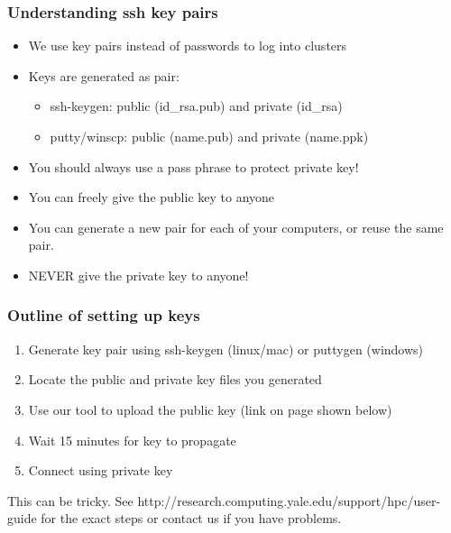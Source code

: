 \documentclass[10pt]{beamer}
\begin{document}
\begin{frame}[fragile]
\frametitle{Understanding ssh key pairs}
\begin{itemize}
\item We use key pairs instead of passwords to log into clusters
\item Keys are generated as pair:
\begin{itemize}
\item ssh-keygen: public (id\_rsa.pub) and private (id\_rsa)
\item putty/winscp: public (name.pub) and private (name.ppk)
\end{itemize}
\item You should always use a pass phrase to protect private key!
\item You can freely give the public key to anyone
\item You can generate a new pair for each of your computers, or reuse the same pair.
\item NEVER give the private key to anyone!
\end{itemize}
\end{frame}

\begin{frame}[fragile]

\frametitle{Outline of setting up keys}
\begin{enumerate}
\item Generate key pair using ssh-keygen (linux/mac) or puttygen (windows)
\item Locate the public and private key files you generated
\item Use our tool to upload the public key (link on page shown below)
\item Wait 15 minutes for key to propagate
\item Connect using private key
\end{enumerate}

This can be tricky.  See http://research.computing.yale.edu/support/hpc/user-guide
for the exact steps or contact us if you have problems.

\end{frame}
\end{document}

